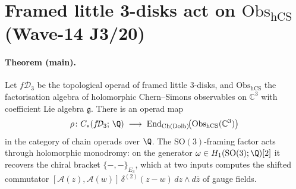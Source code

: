 
\providecommand{\Obs}{\mathrm{Obs}}
\providecommand{\hCS}{\mathrm{hCS}}
\providecommand{\CE}{\mathrm{CE}}
\providecommand{\Ch}{\mathrm{Ch}}
\providecommand{\Dolb}{\mathrm{Dolb}}
\providecommand{\Conf}{\mathrm{Conf}}
\providecommand{\FM}{\overline{\mathrm{FM}}}
\providecommand{\fD}{f\!\mathcal{D}}
\providecommand{\cD}{\mathcal{D}}
\providecommand{\cK}{\mathcal{K}}
\providecommand{\cA}{\mathcal{A}}
\providecommand{\cE}{\mathcal{E}}
\providecommand{\cO}{\mathcal{O}}
\providecommand{\dbar}{\bar\partial}
\providecommand{\kch}{\kappa_{\mathrm{ch}}}
\providecommand{\C}{\mathbb{C}}
\providecommand{\R}{\mathbb{R}}
\providecommand{\Sym}{\mathrm{Sym}}
\providecommand{\chir}{\mathrm{chir}}
\providecommand{\End}{\mathrm{End}}
\providecommand{\SO}{\mathrm{SO}}
\providecommand{\g}{\mathfrak{g}}
\providecommand{\Conf}{\mathrm{Conf}}

\section*{Framed little 3-disks act on $\Obs_{\hCS}$
  (Wave-14 J3/20)}

\paragraph{Theorem (main).}
Let $\fD_3$ be the topological operad of framed little 3-disks, and
$\Obs_{\hCS}$ the factorisation algebra of holomorphic
Chern--Simons observables on $\C^3$ with coefficient Lie algebra
$\g$. There is an operad map
\[
  \rho\colon C_*(\fD_3;\,\Q)\;\longrightarrow\;\End_{\Ch(\Dolb)}\!\bigl(\Obs_{\hCS}(\C^3)\bigr)
\]
in the category of chain operads over $\Q$. The $\SO(3)$-framing
factor acts through holomorphic monodromy: on the generator
$\omega \in H_1(\SO(3);\Q)[2]$ it recovers the chiral bracket
$\{-,-\}_{E_3}$, which at two inputs computes the shifted
commutator $[\cA(z),\cA(w)]\,\delta^{(2)}(z-w)\,dz\wedge d\bar z$
of gauge fields.

